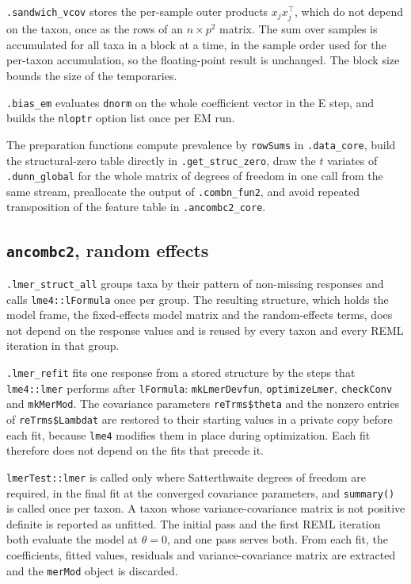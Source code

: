 \documentclass[11pt]{article}
\newcommand{\code}[1]{\texttt{#1}}
\begin{document}
\code{.sandwich\_vcov} stores the per-sample outer products $x_j x_j^{\top}$,
which do not depend on the taxon, once as the rows of an $n \times p^2$ matrix.
The sum over samples is accumulated for all taxa in a block at a time, in the
sample order used for the per-taxon accumulation, so the floating-point result
is unchanged. The block size bounds the size of the temporaries.

\code{.bias\_em} evaluates \code{dnorm} on the whole coefficient vector in the
E step, and builds the \code{nloptr} option list once per EM run.

The preparation functions compute prevalence by \code{rowSums} in
\code{.data\_core}, build the structural-zero table directly in
\code{.get\_struc\_zero}, draw the $t$ variates of \code{.dunn\_global} for the
whole matrix of degrees of freedom in one call from the same stream, preallocate
the output of \code{.combn\_fun2}, and avoid repeated transposition of the
feature table in \code{.ancombc2\_core}.

\subsection*{\code{ancombc2}, random effects}

\code{.lmer\_struct\_all} groups taxa by their pattern of non-missing responses
and calls \code{lme4::lFormula} once per group. The resulting structure, which
holds the model frame, the fixed-effects model matrix and the random-effects
terms, does not depend on the response values and is reused by every taxon and
every REML iteration in that group.

\code{.lmer\_refit} fits one response from a stored structure by the steps that
\code{lme4::lmer} performs after \code{lFormula}: \code{mkLmerDevfun},
\code{optimizeLmer}, \code{checkConv} and \code{mkMerMod}. The covariance
parameters \code{reTrms\$theta} and the nonzero entries of
\code{reTrms\$Lambdat} are restored to their starting values in a private copy
before each fit, because \code{lme4} modifies them in place during
optimization. Each fit therefore does not depend on the fits that precede it.

\code{lmerTest::lmer} is called only where Satterthwaite degrees of freedom are
required, in the final fit at the converged covariance parameters, and
\code{summary()} is called once per taxon. A taxon whose variance-covariance
matrix is not positive definite is reported as unfitted. The initial pass and
the first REML iteration both evaluate the model at $\theta = 0$, and one pass
serves both. From each fit, the coefficients, fitted values, residuals and
variance-covariance matrix are extracted and the \code{merMod} object is
discarded.
\end{document}
